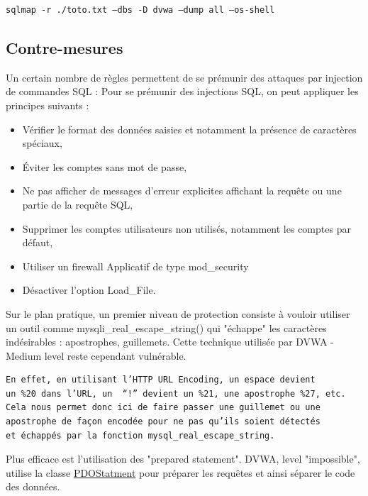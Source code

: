 \begin{verbatim}
sqlmap -r ./toto.txt –dbs -D dvwa –dump all –os-shell
\end{verbatim}


\subsection{Contre-mesures}

Un certain nombre de règles permettent de se prémunir des attaques par injection de commandes SQL :
Pour se prémunir des injections SQL, on peut appliquer les principes suivants :
 \begin{itemize}[font=\color{magenta} \Large, label=]
	\item Vérifier le format des données saisies et notamment
	la présence de caractères spéciaux, 
	\item Éviter les comptes sans mot de passe,
	\item Ne pas afficher de messages d’erreur explicites affichant la requête ou une partie de la requête SQL,
	\item Supprimer les comptes utilisateurs non utilisés, notamment les comptes par défaut,
	\item Utiliser un firewall Applicatif de type mod\_security
    \item Désactiver l’option Load\_File.
\end{itemize}


Sur le plan pratique, un premier niveau de protection consiste à vouloir utiliser un outil comme mysqli\_real\_escape\_string() qui "échappe" les caractères indésirables : apostrophes, guillemets. Cette technique utilisée par DVWA - Medium level reste cependant vulnérable.

\begin{verbatim}
En effet, en utilisant l’HTTP URL Encoding, un espace devient 
un %20 dans l’URL, un  “!” devient un %21, une apostrophe %27, etc.
Cela nous permet donc ici de faire passer une guillemet ou une 
apostrophe de façon encodée pour ne pas qu’ils soient détectés 
et échappés par la fonction mysql_real_escape_string.
\end{verbatim}

Plus efficace est l'utilisation des "prepared statement". DVWA, level "impossible", utilise la classe \href{https://secure.php.net/manual/fr/class.pdostatement.php}{PDOStatment} pour préparer les requêtes et ainsi séparer le code des données.  


